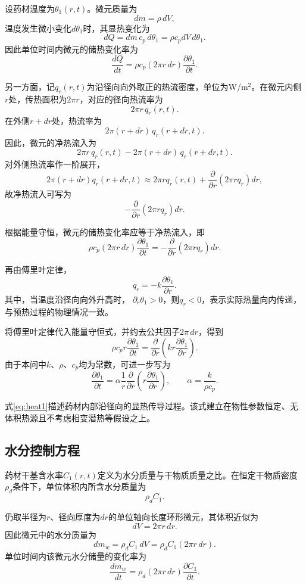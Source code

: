 \documentclass[withoutpreface]{cumcmthesis}
\begin{document}
设药材温度为$\theta_1(r,t)$。微元质量为
\[
dm=\rho\,dV,
\]
温度发生微小变化$d\theta_1$时，其显热变化为
\[
dQ=dm\,c_p\,d\theta_1
=\rho c_p dV\,d\theta_1.
\]
因此单位时间内微元的储热变化率为
\[
\frac{dQ}{dt}
=
\rho c_p(2\pi r\,dr)
\frac{\partial\theta_1}{\partial t}.
\]

另一方面，记$q_r(r,t)$为沿径向向外取正的热流密度，单位为W/m$^2$。在微元内侧$r$处，传热面积为$2\pi r$，对应的径向热流率为
\[
2\pi r\,q_r(r,t).
\]
在外侧$r+dr$处，热流率为
\[
2\pi(r+dr)\,q_r(r+dr,t).
\]
因此，微元的净热流入为
\[
2\pi r\,q_r(r,t)
-
2\pi(r+dr)\,q_r(r+dr,t).
\]
对外侧热流率作一阶展开，
\[
2\pi(r+dr)q_r(r+dr,t)
\approx
2\pi rq_r(r,t)
+
\frac{\partial}{\partial r}
\left(2\pi rq_r\right)dr,
\]
故净热流入可写为
\[
-\frac{\partial}{\partial r}
\left(2\pi rq_r\right)dr.
\]

根据能量守恒，微元的储热变化率应等于净热流入，即
\[
\rho c_p(2\pi r\,dr)
\frac{\partial\theta_1}{\partial t}
=
-\frac{\partial}{\partial r}
\left(2\pi rq_r\right)dr.
\]

再由傅里叶定律，
\[
q_r
=
-k\frac{\partial\theta_1}{\partial r}.
\]
其中，当温度沿径向向外升高时，
$\partial_r\theta_1>0$，则$q_r<0$，表示实际热量向内传递，与预热过程的物理情况一致。

将傅里叶定律代入能量守恒式，并约去公共因子$2\pi\,dr$，得到
\[
\rho c_p r
\frac{\partial\theta_1}{\partial t}
=
\frac{\partial}{\partial r}
\left(
kr\frac{\partial\theta_1}{\partial r}
\right).
\]
由于本问中$k$、$\rho$、$c_p$均为常数，可进一步写为
\begin{equation}
\frac{\partial\theta_1}{\partial t}
=
\alpha\frac1r
\frac{\partial}{\partial r}
\left(
r\frac{\partial\theta_1}{\partial r}
\right),
\qquad
\alpha=\frac{k}{\rho c_p}.
\label{eq:heat1}
\end{equation}

式\eqref{eq:heat1}描述药材内部沿径向的显热传导过程。该式建立在物性参数恒定、无体积热源且不考虑相变潜热等假设之上。
\subsection{水分控制方程}

药材干基含水率$C_1(r,t)$定义为水分质量与干物质质量之比。在恒定干物质密度$\rho_d$条件下，单位体积内所含水分质量为
\[
\rho_d C_1.
\]

仍取半径为$r$、径向厚度为$dr$的单位轴向长度环形微元，其体积近似为
\[
dV=2\pi r\,dr.
\]
因此微元中的水分质量为
\[
dm_w
=
\rho_d C_1\,dV
=
\rho_d C_1(2\pi r\,dr).
\]
单位时间内该微元水分储量的变化率为
\[
\frac{dm_w}{dt}
=
\rho_d(2\pi r\,dr)
\frac{\partial C_1}{\partial t}.
\]
\end{document}
